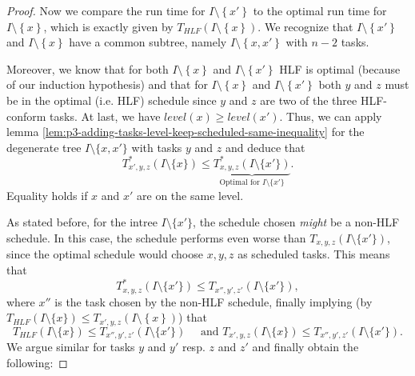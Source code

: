 \begin{proof}
  Now we compare the run time for $I\setminus\left\{ x' \right\}$ to the optimal run time for $I \setminus\left\{ x \right\}$, which is exactly given by $T_{HLF}\left( I \setminus\left\{ x \right\} \right)$. We recognize that $I\setminus\left\{ x' \right\}$ and $I\setminus\left\{ x \right\}$ have a common subtree, namely $I\setminus\left\{ x,x' \right\}$ with $n-2$ tasks.
  
  Moreover, we know that for both $I\setminus\left\{ x \right\}$ and $I\setminus\left\{ x' \right\}$ HLF is optimal (because of our induction hypothesis) and that for $I\setminus\left\{ x \right\}$ and $I\setminus\left\{ x' \right\}$ both $y$ and $z$ must be in the optimal (i.e. HLF) schedule since $y$ and $z$ are two of the three HLF-conform tasks. At last, we have $level(x) \geq level(x')$.
  Thus, we can apply lemma \ref{lem:p3-adding-tasks-level-keep-scheduled-same-inequality} for the degenerate tree $I\setminus \{x,x'\}$ with tasks $y$ and $z$ and deduce that
  \begin{equation*}
    T^*_{x',y,z}(I\setminus\{x\}) 
    \leq 
    \underbrace{T^*_{x,y,z}(I\setminus\{x'\})}_{\text{Optimal for $I\setminus \{x'\}$}}.
  \end{equation*}
  Equality holds if $x$ and $x'$ are on the same level.

  As stated before, for the intree $I\setminus\{x'\}$, the schedule chosen \emph{might} be a non-HLF schedule. In this case, the schedule performs even worse than $T_{x,y,z}(I\setminus\{ x'  \})$, since the optimal schedule would choose $x,y,z$ as scheduled tasks. This means that
  \begin{equation*}
    T^*_{x,y,z}(I\setminus\{x'\})
    \leq
    T_{x'',y',z'}(I\setminus\{x'\}),
  \end{equation*}
  where $x''$ is the task chosen by the non-HLF schedule, finally implying (by $T_{HLF}(I\setminus\{x\}) \leq T_{x',y,z}\left( I\setminus\left\{ x \right\} \right)$) that
  \begin{equation*}
    T_{HLF}(I\setminus\{x\})
    \leq
    T_{x'',y',z'}(I\setminus\{x'\})
    \quad
    \text{ and }
    T_{x',y,z}(I\setminus\{x\})
    \leq
    T_{x'',y',z'}(I\setminus\{x'\})
    .
  \end{equation*}
  We argue similar for tasks $y$ and $y'$ resp. $z$ and $z'$ and finally obtain the following:


\end{proof}
